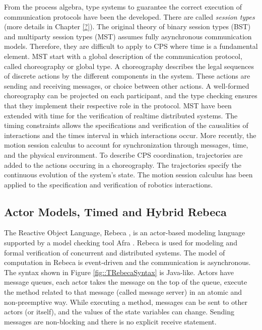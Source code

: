 \documentclass[
graybox,
envcountchap
]{svmult}
\begin{document}
\begin{bibunit}

From the process algebra, type systems to guarantee the correct execution of communication protocols have been the developed.
There are called \emph{session types} (more details in Chapter \ref{?}). 
The original theory of binary session types (BST) \cite{DBLP:conf/esop/HondaVK98} and multiparty session types (MST) \cite{DBLP:journals/jacm/HondaYC16} assumes fully asynchronous communication models.
Therefore, they are difficult to apply to CPS where time is a fundamental element.
%
MST start with a global description of the communication protocol, called choreography or global type.
A choreography describes the legal sequences of discrete actions by the different components in the system.
These actions are sending and receiving messages, or choice between other actions.
A well-formed choreography can be projected on each participant, and the type checking ensures that they implement their respective role in the protocol.
%
MST have been extended with time \cite{DBLP:conf/concur/BocchiYY14,DBLP:conf/esop/BocchiMVY19} for the verification of realtime distributed systems.
The timing constraints allows the specifications and verification of the causalities of interactions and the times interval in which interactions occur.
More recently, the motion session calculus \cite{DBLP:conf/ecoop/MajumdarPYZ19} to account for synchronization through messages, time, and the physical environment.
To describe CPS coordination, trajectories are added to the actions occuring in a choreography.
The trajectories specify the continuous evolution of the system's state.
The motion session calculus has been applied to the specification and verification of robotics interactions.







\subsection{Actor Models,  Timed and Hybrid Rebeca}
The Reactive Object Language, Rebeca \cite{DBLP:journals/fuin/SirjaniMSB04,DBLP:conf/birthday/SirjaniJ11}, is an actor-based \cite{Hewitt:77:Actors,Agha90} modeling language  supported by a model checking tool Afra \cite{Afra}.
Rebeca is used for modeling and formal verification of concurrent and distributed systems.
The model of computation in  Rebeca is event-driven and the communication is asynchronous.
The syntax shown in Figure \ref{fig::TRebecaSyntax} is Java-like. 
Actors have message queues, each actor takes the message on the top of the queue, execute the method related to that message (called message server) in an atomic and non-preemptive way. While executing a method, messages can be sent to other actors (or itself), and the values of the state variables can change. Sending messages are non-blocking and there is no explicit receive statement.


\end{bibunit}
\end{document}
